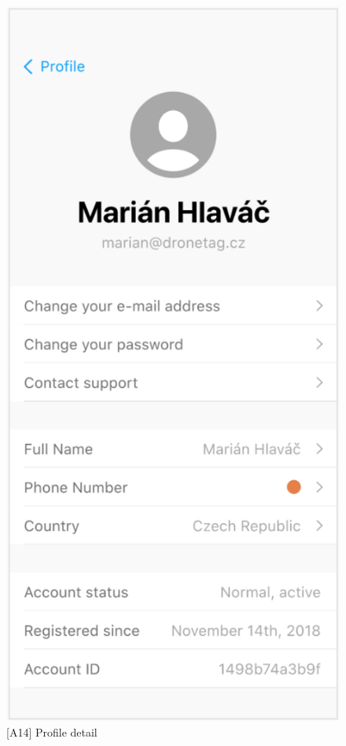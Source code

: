 \begin{figure}
\begin{minipage}{.45\textwidth}
        \includegraphics[width=.7\linewidth]{assets/user_interface_design/profile/profile_detail.png}
        \caption{[A14] Profile detail}
        \label{fig:profile_detail}
    \end{minipage}
    \label{fig:profile_all}
\end{figure}
